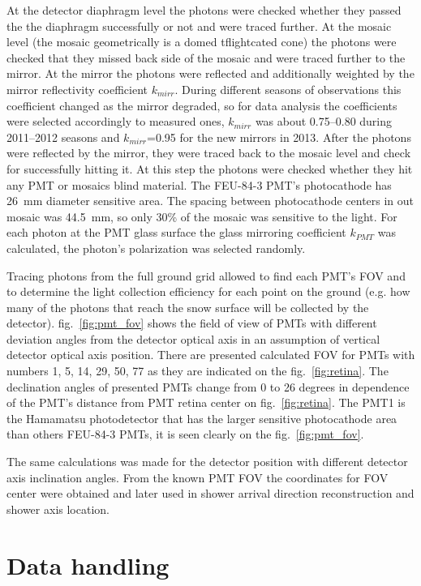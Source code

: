 \documentclass[final,5p,times,twocolumn]{elsarticle}
\begin{document}
At the detector diaphragm level the photons were checked whether they passed the the diaphragm successfully or not and were traced further. At the mosaic level (the mosaic geometrically is a domed {\color{red}tflightcated} cone) the photons were checked that they missed back side of the mosaic and were traced further to the mirror. At the mirror the photons were reflected and additionally weighted by the mirror reflectivity coefficient $k_{mirr}$. During different seasons of observations this coefficient changed as the mirror degraded, so for data analysis the coefficients were selected accordingly to {\color{red} measured ones}, $k_{mirr}$ was about 0.75--0.80 during 2011--2012 seasons and $k_{mirr}$=0.95 for the new mirrors in 2013. After the photons were reflected by the mirror, they were traced back to the mosaic level and check for successfully hitting it. At this step the photons were checked whether they hit any PMT or mosaics blind material. The \mbox{FEU-84-3} PMT's photocathode has 26~mm diameter sensitive area. The spacing between photocathode centers in out mosaic was 44.5~mm, so only 30\% of the mosaic was sensitive to the light. For each photon at the PMT glass surface the glass mirroring coefficient $k_{PMT}$ was calculated, the photon's polarization was selected randomly.

Tracing photons from the full ground grid allowed to find each PMT's FOV and to determine the light collection efficiency for each point on the ground (e.g. how many of the photons that reach the snow surface will be collected by the detector).
fig.~\ref{fig:pmt_fov} shows the field of view of PMTs with different deviation angles  from the detector optical axis in an assumption of vertical detector optical axis position. There are presented calculated FOV for PMTs with numbers 1, 5, 14, 29, 50, 77 as they are indicated on the fig.~\ref{fig:retina}. The declination angles of presented PMTs change from 0 to 26 degrees in dependence of the PMT's distance from PMT retina center on fig.~\ref{fig:retina}. The PMT1 is the Hamamatsu photodetector that has the larger sensitive photocathode area than others FEU-84-3 PMTs, it is seen clearly on the fig.~\ref{fig:pmt_fov}. 

The same calculations was made for the detector position with different detector axis inclination angles. From the known PMT FOV the coordinates for FOV center were obtained and later used in shower arrival direction reconstruction and shower axis location.

\section{Data handling}
\end{document}
